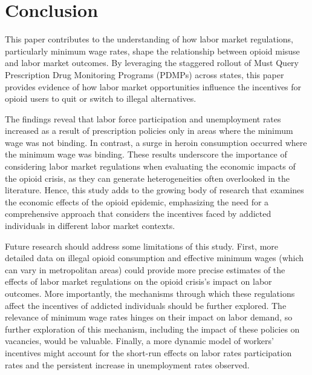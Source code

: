 \documentclass[12pt,a4paper]{article}
\begin{document}
\section*{Conclusion}

This paper contributes to the understanding of how labor market regulations, particularly minimum wage rates, shape the relationship between opioid misuse and labor market outcomes.
By leveraging the staggered rollout of Must Query Prescription Drug Monitoring Programs (PDMPs) across states, this paper provides evidence of how labor market opportunities influence the incentives for opioid users to quit or switch to illegal alternatives.

The findings reveal that labor force participation and unemployment rates increased as a result of prescription policies only in areas where the minimum wage was not binding.
In contrast, a surge in heroin consumption occurred where the minimum wage was binding.
These results underscore the importance of considering labor market regulations when evaluating the economic impacts of the opioid crisis, as they can generate heterogeneities often overlooked in the literature.
Hence, this study adds to the growing body of research that examines the economic effects of the opioid epidemic, emphasizing the need for a comprehensive approach that considers the incentives faced by addicted individuals in different labor market contexts.

Future research should address some limitations of this study.
First, more detailed data on illegal opioid consumption and effective minimum wages (which can vary in metropolitan areas) could provide more precise estimates of the effects of labor market regulations on the opioid crisis's impact on labor outcomes.
More importantly, the mechanisms through which these regulations affect the incentives of addicted individuals should be further explored.
The relevance of minimum wage rates hinges on their impact on labor demand, so further exploration of this mechanism, including the impact of these policies on vacancies, would be valuable.
Finally, a more dynamic model of workers' incentives might account for the short-run effects on labor rates participation rates and the persistent increase in unemployment rates observed.

\newpage

\printbibliography

\newpage
\end{document}
